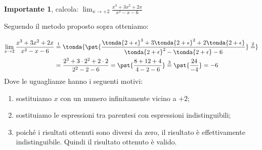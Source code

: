\begin{esempio}
\textbf{Importante 1}, calcola: \quad 
  \(\displaystyle \lim_{x \rightarrow +2} \frac{x^3+3x^2+2x}{x^2-x-6}\)
 
Seguendo il metodo proposto sopra otteniamo:

\begin{align*}
\lim_{x \rightarrow 2} \frac{x^3+3x^2+2x}{x^2-x-6} & \stackrel{1}{=} 
\tonda{\pst{\frac
  {\tonda{2+\epsilon}^3+3\tonda{2+\epsilon}^2+2\tonda{2+\epsilon}}
  {\tonda{2+\epsilon}^2-\tonda{2+\epsilon}-6}} \stackrel{2}{=}}\\ 
  &=\frac{2^3+3\cdot 2^2+2\cdot 2}{2^2-2-6} =
  \pst{\frac{8+12+4}{4-2-6}} \stackrel{3}{=} \pst{\frac{24}{-4}} =-6
\end{align*}
Dove le uguaglianze hanno i seguenti motivi:
\begin{enumerate} [nosep]
 \item sostituiamo \(x\) con un numero infinitamente vicino a \(+2\);
 \item sostituiamo le espressioni tra parentesi con espressioni 
indistinguibili;
 \item poiché i risultati ottenuti sono diversi da zero, il risultato è 
effettivamente indistinguibile. Quindi il risultato ottenuto è valido.
\end{enumerate}
\end{esempio}

